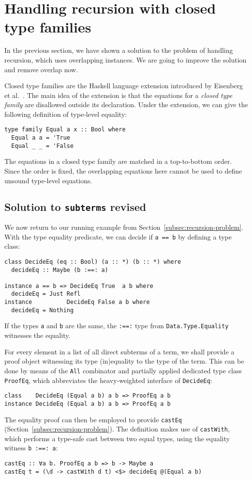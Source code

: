 \documentclass[runningheads]{llncs}
\newcommand{\K}[1]{\lstinline[style=fancy]{#1}}
\begin{document}
\section{Handling recursion with closed type families}
\label{sec:handling-recursion}


In the previous section, we have shown a solution to the problem of handling recursion, which uses overlapping instances. We are going to improve the solution and remove overlap now.

Closed type families are the Haskell language extension introduced by Eisenberg et al.~\cite{Eisenberg2014}. The main idea of the extension is that the equations for a \emph{closed type family} are disallowed outside its declaration. Under the extension, we can give the following definition of type-level equality:
\begin{lstlisting}[style=fancy]
type family Equal a x :: Bool where
  Equal a a = 'True
  Equal _ _ = 'False
\end{lstlisting}
The equations in a closed type family are matched in a top-to-bottom order. Since the order is fixed, the overlapping equations here cannot be used to define unsound type-level equations.

\subsection{Solution to \K{subterms} revised}
\label{subsec:solve-subterms}

We now return to our running example from Section~\ref{subsec:recursion-problem}. With the type equality predicate, we can decide if \K{a == b} by defining a type class:
\begin{lstlisting}[style=fancy]
class DecideEq (eq :: Bool) (a :: *) (b :: *) where
  decideEq :: Maybe (b :==: a)

instance a == b => DecideEq True  a b where
  decideEq = Just Refl
instance          DecideEq False a b where
  decideEq = Nothing
\end{lstlisting}
If the types \K{a} and \K{b} are the same, the \K{:==:} type from \K{Data.Type.Equality} witnesses the equality.

For every element in a list of all direct subterms of a term, we shall provide a proof object witnessing its type (in)equality to the type of the term. This can be done by means of the \K{All} combinator and partially applied dedicated type class \K{ProofEq}, which abbreviates the heavy-weighted interface of \K{DecideEq}:
\begin{lstlisting}[style=fancy]
class    DecideEq (Equal a b) a b => ProofEq a b
instance DecideEq (Equal a b) a b => ProofEq a b
\end{lstlisting}
The equality proof can then be employed to provide \K{castEq} (Section~\ref{subsec:recursion-problem}). The definition makes use of \K{castWith}, which performs a type-safe cast between two equal types, using the equality witness \K{b :==: a}:
\begin{lstlisting}[style=fancy]
castEq :: ∀a b. ProofEq a b => b -> Maybe a
castEq t = (\d -> castWith d t) <$> decideEq @(Equal a b)
\end{lstlisting}
\end{document}
